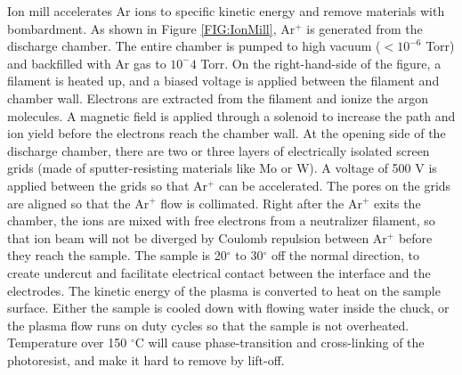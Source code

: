 \documentclass[pdflatex, sectionletters, 12pt]{pittetd}    %
\begin{document}
Ion mill accelerates Ar ions to specific kinetic energy and remove materials with bombardment. As shown in Figure \ref{FIG:IonMill}, Ar$^+$ is generated from the discharge chamber. The entire chamber is pumped to high vacuum ($< 10^{-6}$ Torr) and backfilled with Ar gas to $10^-4$ Torr. On the right-hand-side of the figure, a filament is heated up, and a biased voltage is applied between the filament and chamber wall. Electrons are extracted from the filament and ionize the argon molecules. A magnetic field is applied through a solenoid to increase the path and ion yield before the electrons reach the chamber wall. At the opening side of the discharge chamber, there are two or three layers of electrically isolated screen grids (made of sputter-resisting materials like Mo or W). A voltage of 500 V is applied between the grids so that Ar$^+$ can be accelerated. The pores on the grids are aligned so that the Ar$^{+}$ flow is collimated. Right after the Ar$^{+}$ exits the chamber, the ions are mixed with free electrons from a neutralizer filament, so that ion beam will not be diverged by Coulomb repulsion between Ar$^{+}$ before they reach the sample. The sample is 20$^{\circ}$ to 30$^{\circ}$ off the normal direction, to create undercut and facilitate electrical contact between the interface and the electrodes. The kinetic energy of the plasma is converted to heat on the sample surface. Either the sample is cooled down with flowing water inside the chuck, or the plasma flow runs on duty cycles so that the sample is not overheated. Temperature over 150 $^{\circ}$C will cause phase-transition and cross-linking of the photoresist, and make it hard to remove by lift-off.
\end{document}
